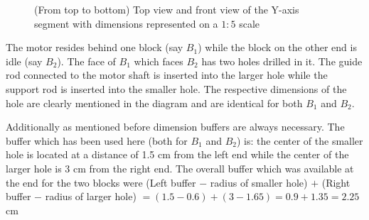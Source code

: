 \begin{figure}[h]
 \begin{center}
 \end{center}
 \begin{center}
 \end{center}
 \caption{(From top to bottom) Top view and front view of the Y-axis segment with dimensions represented on a $1:5$ scale}
 \label{fig:yaxis}
\end{figure}

The motor resides behind one block (say $B_{1}$) while the block on the other end is idle (say $B_{2}$). The face of $B_{1}$ which faces $B_{2}$ has two holes drilled in it. The guide rod connected to the motor shaft is inserted into the larger hole while the support rod is inserted into the smaller hole. The respective dimensions of the hole are clearly mentioned in the diagram and are identical for both $B_{1}$ and $B_{2}$. \par

Additionally as mentioned before dimension buffers are always necessary. The buffer which has been used here (both for $B_{1}$ and $B_{2}$) is: the center of the smaller hole is located at a distance of 1.5 cm from the left end while the center of the larger hole is 3 cm from the right end. The overall buffer which was available at the end for the two blocks were
(Left buffer $-$ radius of smaller hole) $+$ (Right buffer $-$ radius of larger hole)
$= (1.5 - 0.6) + (3 - 1.65)
 = 0.9 + 1.35
 = 2.25$ cm \par

